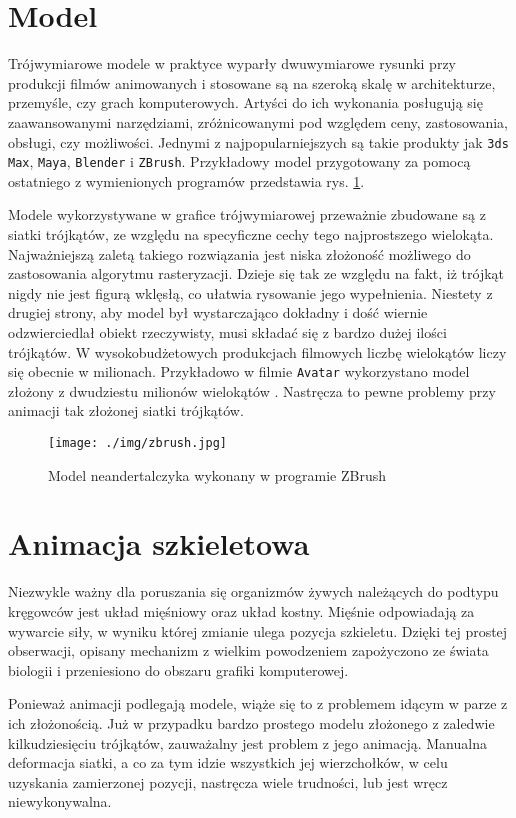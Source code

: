 \documentclass[11pt]{mwrep}
\begin{document}
  \section{Model}
Trójwymiarowe modele w praktyce wyparły dwuwymiarowe rysunki przy produkcji filmów animowanych i stosowane są na szeroką skalę w architekturze, przemyśle, czy grach komputerowych. Artyści do ich wykonania posługują się zaawansowanymi narzędziami, zróżnicowanymi pod względem ceny, zastosowania, obsługi, czy możliwości. Jednymi z najpopularniejszych są takie produkty jak \texttt{3ds Max}, \texttt{Maya}, \texttt{Blender} i \texttt{ZBrush}. Przykładowy model przygotowany za pomocą ostatniego z wymienionych programów przedstawia rys. \ref{img:zbrush}.

Modele wykorzystywane w grafice trójwymiarowej przeważnie zbudowane są z siatki trójkątów, ze względu na specyficzne cechy tego najprostszego wielokąta. Najważniejszą zaletą takiego rozwiązania jest niska złożoność możliwego do zastosowania algorytmu rasteryzacji. Dzieje się tak ze względu na fakt, iż trójkąt nigdy nie jest figurą wklęsłą, co ułatwia rysowanie jego wypełnienia. Niestety z drugiej strony, aby model był wystarczająco dokładny i dość wiernie odzwierciedlał obiekt rzeczywisty, musi składać się z bardzo dużej ilości trójkątów. W wysokobudżetowych produkcjach filmowych liczbę wielokątów liczy się obecnie w milionach. Przykładowo w filmie \texttt{Avatar} wykorzystano model złożony z dwudziestu milionów wielokątów \cite{avatar}. Nastręcza to pewne problemy przy animacji tak złożonej siatki trójkątów.

    \begin{figure}
  \centering
    \texttt{[image: ./img/zbrush.jpg]}
  \caption{Model neandertalczyka wykonany w programie ZBrush \cite{zbrush}}
  \label{img:zbrush}
  \end{figure}
  \section{Animacja szkieletowa}

Niezwykle ważny dla poruszania się organizmów żywych należących do podtypu kręgowców jest układ mięśniowy oraz układ kostny. Mięśnie odpowiadają za wywarcie siły, w wyniku której zmianie ulega pozycja szkieletu. Dzięki tej prostej obserwacji, opisany mechanizm z wielkim powodzeniem zapożyczono ze świata biologii i przeniesiono do obszaru grafiki komputerowej.

Ponieważ animacji podlegają modele, wiąże się to z problemem idącym w parze z ich złożonością. Już w przypadku bardzo prostego modelu złożonego z zaledwie kilkudziesięciu trójkątów, zauważalny jest problem z jego animacją. Manualna deformacja siatki, a co za tym idzie wszystkich jej wierzchołków, w celu uzyskania zamierzonej pozycji, nastręcza wiele trudności, lub jest wręcz niewykonywalna.
\end{document}

